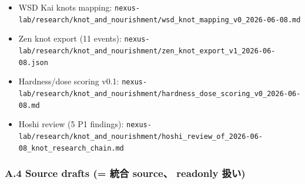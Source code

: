 \documentclass[
]{article}
\providecommand{\tightlist}{%
  \setlength{\itemsep}{0pt}\setlength{\parskip}{0pt}}
\begin{document}
\begin{itemize}
\tightlist
\item
  WSD Kai knots mapping:
  \texttt{nexus-lab/research/knot\_and\_nourishment/wsd\_knot\_mapping\_v0\_2026-06-08.md}
\item
  Zen knot export (11 events):
  \texttt{nexus-lab/research/knot\_and\_nourishment/zen\_knot\_export\_v1\_2026-06-08.json}
\item
  Hardness/dose scoring v0.1:
  \texttt{nexus-lab/research/knot\_and\_nourishment/hardness\_dose\_scoring\_v0\_2026-06-08.md}
\item
  Hoshi review (5 P1 findings):
  \texttt{nexus-lab/research/knot\_and\_nourishment/hoshi\_review\_of\_2026-06-08\_knot\_research\_chain.md}
\end{itemize}

\subsubsection{A.4 Source drafts (= 統合 source、 readonly
扱い)}\label{a.4-source-drafts-ux7d71ux5408-source-readonly-ux6271ux3044}
\end{document}
